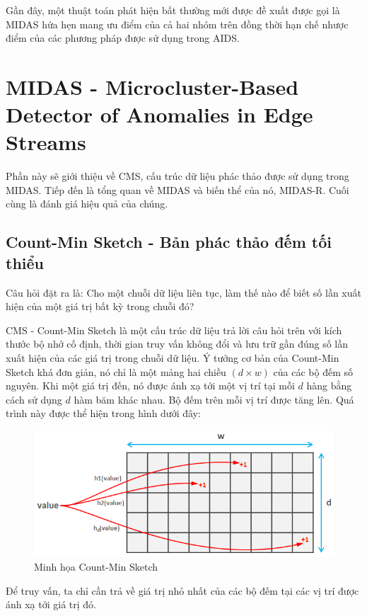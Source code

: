 Gần đây, một thuật toán phát hiện bất thường mới được đề xuất được gọi
là MIDAS hứa hẹn mang ưu điểm của cả hai nhóm trên đồng thời hạn chế nhược điểm của
các phương pháp được sử dụng trong AIDS.

\section{MIDAS - Microcluster-Based Detector of Anomalies in Edge Streams}
Phần này sẽ giới thiệu về  CMS, cấu trúc dữ liệu phác thảo được sử dụng
trong MIDAS. Tiếp đến là tổng quan về MIDAS và biến thể của nó, MIDAS-R. Cuối cùng là
đánh giá hiệu quả của chúng.

\subsection{Count-Min Sketch - Bản phác thảo đếm tối thiểu}
Câu hỏi đặt ra là: Cho một chuỗi dữ liệu liên tục,
làm thế nào để  biết số lần xuất hiện của một giá trị bất kỳ trong chuỗi đó?

CMS - Count-Min Sketch\cite{cms_full} là một cấu trúc dữ liệu trả lời câu hỏi trên với kích thước bộ nhớ cố định,
thời gian truy vấn không đổi và lưu trữ gần đúng số lần xuất hiện
của các giá trị trong chuỗi dữ liệu. Ý tưởng cơ bản của Count-Min Sketch khá đơn giản,
nó chỉ là một mảng hai chiều $(d \times w)$ của các bộ đếm số nguyên.
Khi một giá trị đến, nó được ánh xạ tới một vị trí tại mỗi $d$ hàng bằng cách sử dụng $d$ hàm
băm khác nhau. Bộ đếm trên mỗi vị trí được tăng lên. Quá trình này được thể hiện trong hình dưới đây:

\begin{figure}[h]
    \centering
    \includegraphics[width=1.0\textwidth]{figures/CMS.png}
    \caption{Minh họa Count-Min Sketch}
    \label{fig:1}
\end{figure}

Để truy vấn, ta chỉ cần trả về giá trị nhỏ nhất của các bộ đếm
tại các vị trí được ánh xạ tới giá trị đó.

